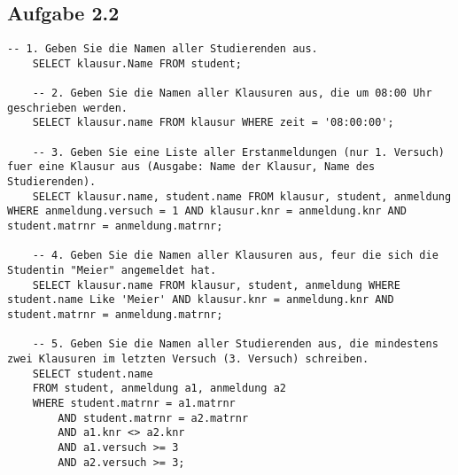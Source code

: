     \subsection{Aufgabe 2.2}
    \begin{lstlisting}[style=sqlstyle, caption={Einfügen von Datensätzen in die Tabellen STUDENT, KLAUSUR und ANMELDUNG}]
    -- 1. Geben Sie die Namen aller Studierenden aus.
    SELECT klausur.Name FROM student;
    
    -- 2. Geben Sie die Namen aller Klausuren aus, die um 08:00 Uhr geschrieben werden.
    SELECT klausur.name FROM klausur WHERE zeit = '08:00:00';

    -- 3. Geben Sie eine Liste aller Erstanmeldungen (nur 1. Versuch) fuer eine Klausur aus (Ausgabe: Name der Klausur, Name des Studierenden).
    SELECT klausur.name, student.name FROM klausur, student, anmeldung WHERE anmeldung.versuch = 1 AND klausur.knr = anmeldung.knr AND student.matrnr = anmeldung.matrnr;

    -- 4. Geben Sie die Namen aller Klausuren aus, feur die sich die Studentin "Meier" angemeldet hat.
    SELECT klausur.name FROM klausur, student, anmeldung WHERE student.name Like 'Meier' AND klausur.knr = anmeldung.knr AND student.matrnr = anmeldung.matrnr;

    -- 5. Geben Sie die Namen aller Studierenden aus, die mindestens zwei Klausuren im letzten Versuch (3. Versuch) schreiben.
    SELECT student.name
    FROM student, anmeldung a1, anmeldung a2
    WHERE student.matrnr = a1.matrnr
        AND student.matrnr = a2.matrnr
        AND a1.knr <> a2.knr
        AND a1.versuch >= 3
        AND a2.versuch >= 3;
    \end{lstlisting}
    
